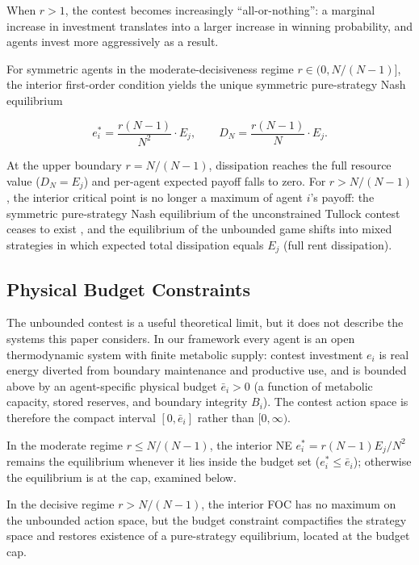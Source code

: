 \documentclass[11pt]{article}
\theoremstyle{plain}
\theoremstyle{definition}
\theoremstyle{remark}
\let\origsubsection\subsection
\renewcommand{\subsection}{\needspace{7\baselineskip}\origsubsection}
\begin{document}
When \(r > 1\), the contest becomes increasingly ``all-or-nothing'': a
marginal increase in investment translates into a larger increase in
winning probability, and agents invest more aggressively as a result.

For symmetric agents in the moderate-decisiveness regime
\(r \in (0, N/(N-1)]\), the interior first-order condition yields the
unique symmetric pure-strategy Nash equilibrium

\[e_i^* = \frac{r(N-1)}{N^2} \cdot E_j, \qquad D_N = \frac{r(N-1)}{N} \cdot E_j.\]

At the upper boundary \(r = N/(N-1)\), dissipation reaches the full
resource value (\(D_N = E_j\)) and per-agent expected payoff falls to
zero. For \(r > N/(N-1)\), the interior critical point is no longer a
maximum of agent \(i\)'s payoff: the symmetric pure-strategy Nash
equilibrium of the unconstrained Tullock contest ceases to exist
\citep{BayeKovenock-deVries1994}, and the equilibrium of the unbounded
game shifts into mixed strategies in which expected total dissipation
equals \(E_j\) (full rent dissipation).

\subsection{Physical Budget
Constraints}\label{physical-budget-constraints}

The unbounded contest is a useful theoretical limit, but it does not
describe the systems this paper considers. In our framework every agent
is an open thermodynamic system with finite metabolic supply: contest
investment \(e_i\) is real energy diverted from boundary maintenance and
productive use, and is bounded above by an agent-specific physical
budget \(\bar e_i > 0\) (a function of metabolic capacity, stored
reserves, and boundary integrity \(B_i\)). The contest action space is
therefore the compact interval \([0, \bar e_i]\) rather than
\([0, \infty)\).

In the moderate regime \(r \leq N/(N-1)\), the interior NE
\(e_i^* = r(N-1) E_j/N^2\) remains the equilibrium whenever it lies
inside the budget set (\(e_i^* \leq \bar e_i\)); otherwise the
equilibrium is at the cap, examined below.

In the decisive regime \(r > N/(N-1)\), the interior FOC has no maximum
on the unbounded action space, but the budget constraint compactifies
the strategy space and restores existence of a pure-strategy
equilibrium, located at the budget cap.
\end{document}
